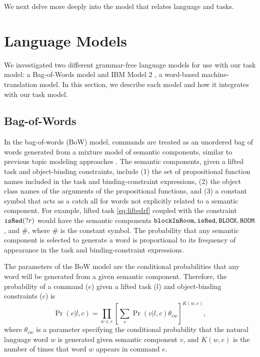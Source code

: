 \documentclass[conference]{IEEEtran}
\begin{document}
We next delve more deeply into the model that relates language and tasks.

\section{Language Models} 
\label{section:lm}

We investigated two different grammar-free language models for use with our task model: a Bag-of-Words model and IBM Model 2 \cite{brown90,brown93}, a word-based machine-translation model. In this section, we describe each model and how it integrates with our task model.

\subsection{Bag-of-Words}
In the bag-of-words (BoW) model, commands are treated as an unordered bag of words generated from a mixture model of semantic components, similar to previous topic modeling approaches \cite{McCallum:1999vn}. The semantic components, given a lifted task and object-binding constraints, include (1) the set of propositional function names included in the task and binding-constraint expressions, (2) the object class names of the arguments of the propositional functions, and (3) a constant symbol that acts as a catch all for words not explicitly related to a semantic component. For example, lifted task \ref{eq:liftedrf} coupled with the constraint ${\tt isRed}(?r)$ would have the semantic components ${\tt blockInRoom}, {\tt isRed}, {\tt BLOCK}, {\tt ROOM}$, and $\#$, where $\#$ is the constant symbol. The probability that any semantic component is selected to generate a word is proportional to its frequency of appearance in the task and binding-constraint expressions.

The parameters of the BoW model are the conditional probabilities that any word will be generated from a given semantic component. Therefore, the probability of a command ($e$) given a lifted task ($l$) and object-binding constraints ($c$) is
\begin{equation}
\Pr(e | l, c)  = \prod_{w \in e} \left[ \sum_v \Pr(v | l, c) \theta_{vw} \right]^{K(w, e)},
\end{equation}
where $\theta_{vw}$ is a parameter specifying the conditional probability that the natural language word $w$ is generated given semantic component $v$, and $K(w, e)$ is the number of times that word $w$ appears in command $e$.
\end{document}
